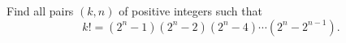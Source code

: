 Find all pairs $(k,n)$ of positive integers such that \[ k!=(2^n-1)(2^n-2)(2^n-4)\cdots(2^n-2^{n-1}). \]
